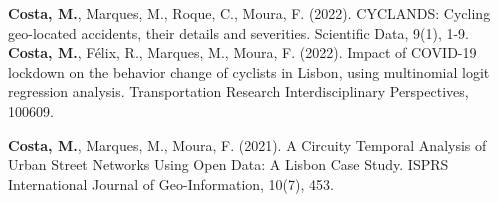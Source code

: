 



\begin{cvpublications}
  \cvpublication
    {\textbf{Costa, M.}, Marques, M., Roque, C., Moura, F. (2022). CYCLANDS: Cycling geo-located accidents, their details and severities. Scientific Data, 9(1), 1-9.}
  \cvpublication
    {\textbf{Costa, M.}, Félix, R., Marques, M., Moura, F. (2022). Impact of COVID-19 lockdown on the behavior change of cyclists in Lisbon, using multinomial logit regression analysis. Transportation Research Interdisciplinary Perspectives, 100609.}

\end{cvpublications}



\begin{cvpublications}
  \cvpublication
    {\textbf{Costa, M.}, Marques, M., Moura, F. (2021). A Circuity Temporal Analysis of Urban Street Networks Using Open Data: A Lisbon Case Study. ISPRS International Journal of Geo-Information, 10(7), 453.}

\end{cvpublications}




